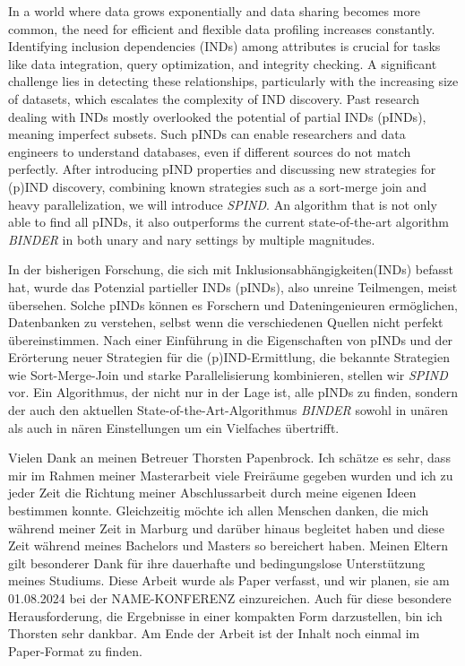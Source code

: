 \documentclass
[
    twoside,                 %
    openright,               %
    cleardoublepage = empty, %
    fontsize = 12 pt,        %
    american,                %
    captions = tableheading, %
    numbers = noenddot,      %
    footheight = 35 pt,      %
]
{scrbook}
\begin{document}
    \frontmatter
    

    \pagestyle{plain}

    In a world where data grows exponentially and data sharing becomes more common, the need for efficient and flexible data profiling increases constantly.  Identifying inclusion dependencies (INDs) among attributes is crucial for tasks like data integration, query optimization, and integrity checking. A significant challenge lies in detecting these relationships, particularly with the increasing size of datasets, which escalates the complexity of IND discovery.
Past research dealing with INDs mostly overlooked the potential of partial INDs (pINDs), meaning imperfect subsets. Such pINDs can enable researchers and data engineers to understand databases, even if different sources do not match perfectly. After introducing pIND properties and discussing new strategies for (p)IND discovery, combining known strategies such as a sort-merge join and heavy parallelization, we will introduce \textit{SPIND}. An algorithm that is not only able to find all pINDs, it also outperforms the current state-of-the-art algorithm \textit{BINDER} in both unary and nary settings by multiple magnitudes.

    In der bisherigen Forschung, die sich mit Inklusionsabhängigkeiten(INDs) befasst hat, wurde das Potenzial partieller INDs (pINDs), also unreine Teilmengen, meist übersehen. Solche pINDs können es Forschern und Dateningenieuren ermöglichen, Datenbanken zu verstehen, selbst wenn die verschiedenen Quellen nicht perfekt übereinstimmen. Nach einer Einführung in die Eigenschaften von pINDs und der Erörterung neuer Strategien für die (p)IND-Ermittlung, die bekannte Strategien wie Sort-Merge-Join und starke Parallelisierung kombinieren, stellen wir \textit{SPIND} vor. Ein Algorithmus, der nicht nur in der Lage ist, alle pINDs zu finden, sondern der auch den aktuellen State-of-the-Art-Algorithmus \textit{BINDER} sowohl in unären als auch in nären Einstellungen um ein Vielfaches übertrifft.

    Vielen Dank an meinen Betreuer Thorsten Papenbrock. Ich schätze es sehr, dass mir im Rahmen meiner Masterarbeit viele Freiräume gegeben wurden und ich zu jeder Zeit die Richtung meiner Abschlussarbeit durch meine eigenen Ideen bestimmen konnte. Gleichzeitig möchte ich allen Menschen danken, die mich während meiner Zeit in Marburg und darüber hinaus begleitet haben und diese Zeit während meines Bachelors und Masters so bereichert haben. Meinen Eltern gilt besonderer Dank für ihre dauerhafte und bedingungslose Unterstützung meines Studiums. Diese Arbeit wurde als Paper verfasst, und wir planen, sie am 01.08.2024 bei der NAME-KONFERENZ einzureichen. Auch für diese besondere Herausforderung, die Ergebnisse in einer kompakten Form darzustellen, bin ich Thorsten sehr dankbar. Am Ende der Arbeit ist der Inhalt noch einmal im Paper-Format zu finden.
\end{document}
